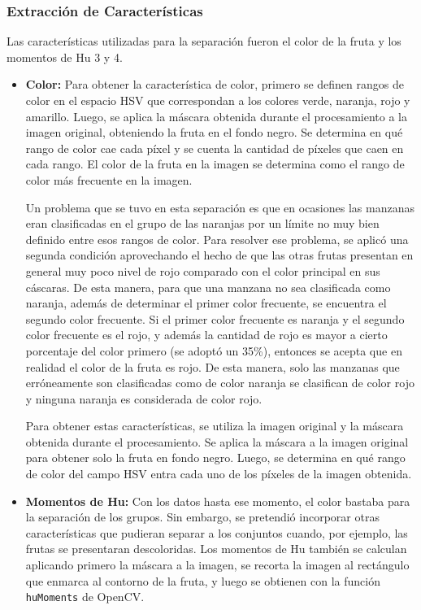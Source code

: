 \documentclass[a4paper, 12pt]{article}
\begin{document}
\subsubsection{Extracción de Características}
Las características utilizadas para la separación fueron el color de la fruta y los momentos de Hu 3 y 4.
\begin{itemize}
    \item \textbf{Color:} Para obtener la característica de color, primero se definen rangos de color en el espacio HSV que correspondan a los colores verde, naranja, rojo y amarillo. Luego, se aplica la máscara obtenida durante el procesamiento a la imagen original, obteniendo la fruta en el fondo negro. Se determina en qué rango de color cae cada píxel y se cuenta la cantidad de píxeles que caen en cada rango. El color de la fruta en la imagen se determina como el rango de color más frecuente en la imagen.
    
    Un problema que se tuvo en esta separación es que en ocasiones las manzanas eran clasificadas en el grupo de las naranjas por un límite no muy bien definido entre esos rangos de color. Para resolver ese problema, se aplicó una segunda condición aprovechando el hecho de que las otras frutas presentan en general muy poco nivel de rojo comparado con el color principal en sus cáscaras. De esta manera, para que una manzana no sea clasificada como naranja, además de determinar el primer color frecuente, se encuentra el segundo color frecuente. Si el primer color frecuente es naranja y el segundo color frecuente es el rojo, y además la cantidad de rojo es mayor a cierto porcentaje del color primero (se adoptó un 35\%), entonces se acepta que en realidad el color de la fruta es rojo. De esta manera, solo las manzanas que erróneamente son clasificadas como de color naranja se clasifican de color rojo y ninguna naranja es considerada de color rojo.
    
    Para obtener estas características, se utiliza la imagen original y la máscara obtenida durante el procesamiento. Se aplica la máscara a la imagen original para obtener solo la fruta en fondo negro. Luego, se determina en qué rango de color del campo HSV entra cada uno de los píxeles de la imagen obtenida.
    \item \textbf{Momentos de Hu:} Con los datos hasta ese momento, el color bastaba para la separación de los grupos. Sin embargo, se pretendió incorporar otras características que pudieran separar a los conjuntos cuando, por ejemplo, las frutas se presentaran descoloridas. Los momentos de Hu también se calculan aplicando primero la máscara a la imagen, se recorta la imagen al rectángulo que enmarca al contorno de la fruta, y luego se obtienen con la función \texttt{huMoments} de OpenCV.
\end{itemize}
\end{document}
